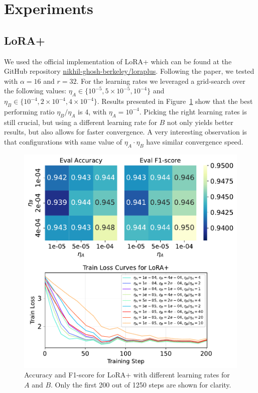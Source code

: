 \documentclass[a4paper,10pt,twocolumn,english]{article}
\begin{document}
\section{Experiments}

\subsection{LoRA+}

We used the official implementation of LoRA+ which can be found at the GitHub repository \href{https://github.com/nikhil-ghosh-berkeley/loraplus}{nikhil-ghosh-berkeley/loraplus}. Following the paper, we tested with $\alpha = 16$ and $r = 32$. For the learning rates we leveraged a grid-search over the following values: $\eta_A \in \{10^{-5}, 5 \times 10^{-5}, 10^{-4}\}$ and $\eta_B \in \{10^{-4}, 2 \times 10^{-4}, 4 \times 10^{-4}\}$. Results presented in Figure~\ref{fig:lora_plus} show that the best performing ratio $\eta_B / \eta_A$ is 4, with $\eta_A = 10^{-4}$. Picking the right learning rates is still crucial, but using a different learning rate for $B$ not only yields better results, but also allows for faster convergence. A very interesting observation is that configurations with same value of $\eta_A \cdot \eta_B$ have similar convergence speed.

\begin{figure}[ht]
    \centering
    \includegraphics[width=1\linewidth]{../plots/lora_plus_train_loss_curves_final_v2.pdf}
    \caption{Accuracy and F1-score for LoRA+ with different learning rates for $A$ and $B$. Only the first 200 out of 1250 steps are shown for clarity.}
    \label{fig:lora_plus}
\end{figure}
\end{document}

